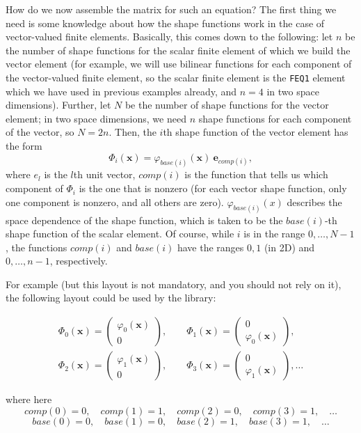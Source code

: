 \documentclass{article}
\renewcommand{\vec}[1]{{\mathbf #1}}
\begin{document}
How do we now assemble the matrix for such an equation? The first thing we
need is some knowledge about how the shape functions work in the case of
vector-valued finite elements. Basically, this comes down to the following:
let $n$ be the number of shape functions for the scalar finite element of
which we build the vector element (for example, we will use bilinear functions
for each component of the vector-valued finite element, so the scalar finite
element is the \texttt{FEQ1} element which we have used in previous examples
already, and $n=4$ in two space dimensions). Further, let $N$ be the number of
shape functions for the vector element; in two space dimensions, we need $n$
shape functions for each component of the vector, so $N=2n$. Then, the $i$th
shape function of the vector element has the form
$$
  \Phi_i(\vec x) = \varphi_{base(i)}(\vec x)\ \vec e_{comp(i)},
$$
where $e_l$ is the $l$th unit vector, $comp(i)$ is the function that tells
us which component of $\Phi_i$ is the one that is nonzero (for
each vector shape function, only one component is nonzero, and all others are
zero). $\varphi_{base(i)}(x)$ describes the space dependence of the shape
function, which is taken to be the $base(i)$-th shape function of the scalar
element. Of course, while $i$ is in the range $0,\ldots,N-1$, the functions
$comp(i)$ and $base(i)$ have the ranges $0,1$ (in 2D) and $0,\ldots,n-1$,
respectively. 

For example (but this layout is not mandatory, and you should not rely on it),
the following layout could be used by the library:
\begin{center}
\begin{multline*}
  \Phi_0(\vec x) = 
  \begin{pmatrix}
    \varphi_0(\vec x) \\ 0
  \end{pmatrix},
  \qquad
  \Phi_1(\vec x) = 
  \begin{pmatrix}
    0 \\ \varphi_0(\vec x)
  \end{pmatrix},
  \\
  \Phi_2(\vec x) = 
  \begin{pmatrix}
    \varphi_1(\vec x) \\ 0
  \end{pmatrix},
  \qquad
  \Phi_3(\vec x) = 
  \begin{pmatrix}
    0 \\ \varphi_1(\vec x)
  \end{pmatrix},
  \ldots
\end{multline*}
\end{center}
where here
$$
  comp(0)=0, \quad  comp(1)=1, \quad  comp(2)=0, \quad  comp(3)=1, \quad  \ldots
$$
$$
  base(0)=0, \quad  base(1)=0, \quad  base(2)=1, \quad  base(3)=1, \quad  \ldots
$$
\end{document}
